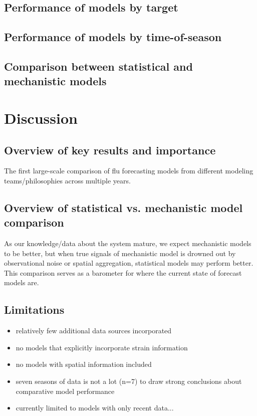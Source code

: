 \documentclass{article}
\begin{document}
\subsection{Performance of models by target}


\subsection{Performance of models by time-of-season}


\subsection{Comparison between statistical and mechanistic models}


\section{Discussion}

\subsection{Overview of key results and importance}
The first large-scale comparison of flu forecasting models from different modeling teams/philosophies across multiple years.

\subsection{Overview of statistical vs. mechanistic model comparison}
As our knowledge/data about the system mature, we expect mechanistic models to be better, but when true signals of mechanistic model is drowned out by observational noise or spatial aggregation, statistical models may perform better. This comparison serves as a barometer for where the current state of forecast models are.

\subsection{Limitations}

\begin{itemize}
    \item relatively few additional data sources incorporated
    \item no models that explicitly incorporate strain information
    \item no models with spatial information included
    \item seven seasons of data is not a lot (n=7) to draw strong conclusions about comparative model performance
    \item currently limited to models with only recent data...
\end{itemize}



\end{document}
